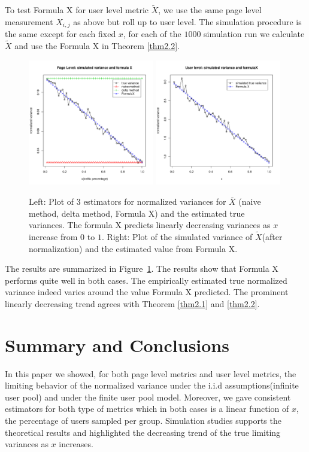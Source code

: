 \documentclass[10pt]{article}
\newcommand{\wX}{\widetilde{X}}
\newcommand{\xbar}{\overline{X}}
\begin{document}
To test Formula X for user level metric $\wX$, we use the same page level measurement $X_{i,j}$ as above but roll up to user level. The simulation procedure is the same except for each fixed $x$, for each of the $1000$ simulation run we calculate $\wX$ and use the Formula X in Theorem \ref{thm2.2}. 
\begin{figure}[!htbp]
  \centering
  \includegraphics[width=0.49\textwidth]{pcr-kpois5}
\includegraphics[width=0.49\textwidth]{usr-kpois5}
  \caption{Left: Plot of 3 estimators for normalized variances for $\xbar$ (naive method, delta method, Formula X) and the estimated true variances. The formula X predicts linearly decreasing variances as $x$ increase from $0$ to $1$. Right: Plot of the simulated variance of $\wX$(after normalization) and the estimated value from Formula X.}
  \label{fig:ctr-poisK}
\end{figure}
The results are summarized in Figure~\ref{fig:ctr-poisK}. The results show that Formula X performs quite well in both cases. The empirically estimated true normalized variance indeed varies around the value Formula X predicted. The prominent linearly decreasing trend agrees with Theorem \ref{thm2.1} and \ref{thm2.2}.



\section{Summary and Conclusions}\label{conclusion}
In this paper we showed, for both page level metrics and user level metrics, the limiting behavior of the normalized variance under the i.i.d assumptions(infinite user pool) and under the finite user pool model. Moreover, we gave consistent estimators for both type of metrics which in both cases is a linear function of $x$, the percentage of users sampled per group. Simulation studies supports the theoretical results and highlighted the decreasing trend of the true limiting variances  as $x$ increases. 
\end{document}
